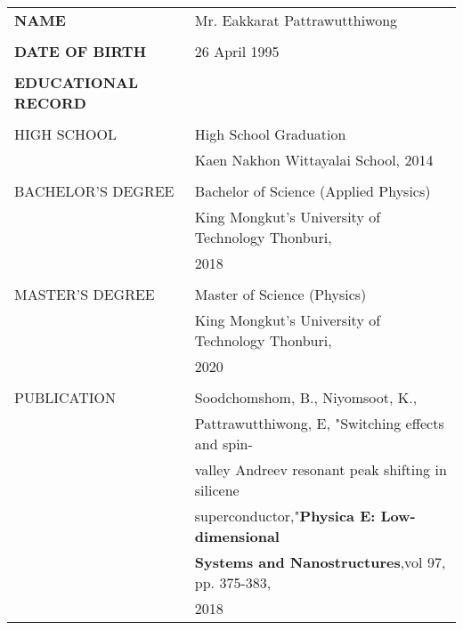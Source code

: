 \small
\noindent \begin{tabular}{ll}
{\bf NAME} & Mr. Eakkarat Pattrawutthiwong\\
& \\
{\bf DATE OF BIRTH} & 26 April  1995\\
& \\
{\bf EDUCATIONAL RECORD} & \\
& \\
HIGH SCHOOL & High School Graduation\\
& Kaen Nakhon Wittayalai School, 2014 \\
& \\
BACHELOR'S DEGREE & Bachelor of Science (Applied Physics) \\
 & King Mongkut's University of Technology Thonburi,\\
 & 2018 \\
& \\
MASTER'S DEGREE & Master of Science (Physics) \\
&  King Mongkut's University of Technology Thonburi, \\
&2020 \\
& \\
PUBLICATION 
& Soodchomshom, B., Niyomsoot, K.,\\
&Pattrawutthiwong, E, "Switching effects and spin- \\
&valley Andreev resonant peak shifting in silicene\\
& superconductor,"\textbf{Physica E: Low-dimensional }\\
&\textbf{Systems and Nanostructures},vol 97, pp. 375-383,\\
&2018\\

\end{tabular}
